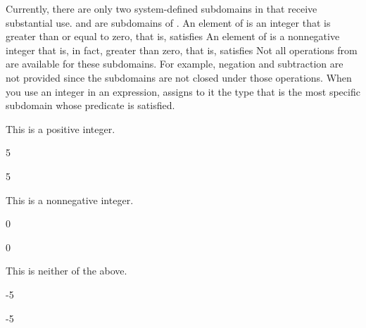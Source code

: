 Currently, there are only two system-defined subdomains in \Language{} that receive
substantial use.
 and
 are subdomains of .
An element  of  is an integer
that is greater than or equal to zero, that is, satisfies
An element  of  is a nonnegative integer
that is, in fact, greater than zero, that is, satisfies 
Not all operations from  are available for these
subdomains.
For example, negation and subtraction are not provided since the subdomains
are not closed under those operations.
When you use an integer in an expression, \Language{} assigns to it the
type that is the most specific subdomain whose predicate is satisfied.
\begin{xtc}
\begin{xtccomment}
This is a positive integer.
\end{xtccomment}
\begin{spadsrc}
5
\end{spadsrc}
\begin{TeXOutput}
\begin{fricasmath}{1}
5%
\end{fricasmath}
\end{TeXOutput}
\end{xtc}
\begin{xtc}
\begin{xtccomment}
This is a nonnegative integer.
\end{xtccomment}
\begin{spadsrc}
0
\end{spadsrc}
\begin{TeXOutput}
\begin{fricasmath}{2}
0%
\end{fricasmath}
\end{TeXOutput}
\end{xtc}
\begin{xtc}
\begin{xtccomment}
This is neither of the above.
\end{xtccomment}
\begin{spadsrc}
-5
\end{spadsrc}
\begin{TeXOutput}
\begin{fricasmath}{3}
-{5}%
\end{fricasmath}
\end{TeXOutput}
\end{xtc}
